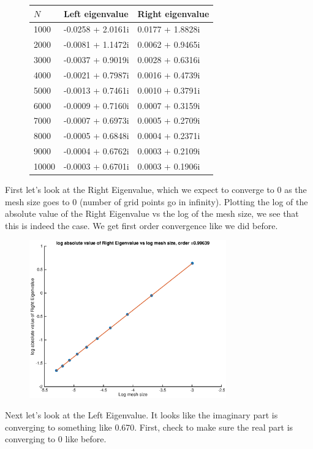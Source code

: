 \documentclass[12pt]{article}
\begin{document}
\begin{figure}[H]
\begin{tabular}{l|ll}
$N$    & Left eigenvalue      &  Right eigenvalue    \\ \hline
  1000 &   -0.0258 + 2.0161i  &    0.0177 + 1.8828i  \\ 
  2000 &   -0.0081 + 1.1472i  &    0.0062 + 0.9465i  \\ 
  3000 &   -0.0037 + 0.9019i  &    0.0028 + 0.6316i  \\ 
  4000 &   -0.0021 + 0.7987i  &    0.0016 + 0.4739i  \\
  5000 &   -0.0013 + 0.7461i  &    0.0010 + 0.3791i  \\ 
  6000 &   -0.0009 + 0.7160i  &    0.0007 + 0.3159i  \\ 
  7000 &   -0.0007 + 0.6973i  &    0.0005 + 0.2709i  \\ 
  8000 &   -0.0005 + 0.6848i  &    0.0004 + 0.2371i  \\ 
  9000 &   -0.0004 + 0.6762i  &    0.0003 + 0.2109i  \\
 10000 &   -0.0003 + 0.6701i  &    0.0003 + 0.1906i  \\ 
\end{tabular}
\end{figure}
First let's look at the Right Eigenvalue, which we expect to converge to 0 as the mesh size goes to 0 (number of grid points go in infinity). Plotting the log of the absolute value of the Right Eigenvalue vs the log of the mesh size, we see that this is indeed the case. We get first order convergence like we did before.

\begin{figure}[H]
\includegraphics[width=8.5cm]{1double2fdrighteigabs}
\end{figure}

Next let's look at the Left Eigenvalue. It looks like the imaginary part is converging to something like 0.670. First, check to make sure the real part is converging to 0 like before.
\end{document}

